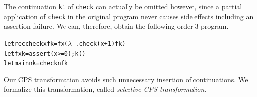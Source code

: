 \begin{enumerate}
 The continuation \texttt{k1} of \texttt{check} can actually be omitted
 however, since a partial application of \texttt{check}
      in the original program never causes side effects including an
      assertion failure.
      We can, therefore, obtain the following order-3 program.
\vspace{-5pt}
\begin{alltt}
 letrec check x f k = f x (\(\lambda\)_.check (x+1) f k)
 let f x k = assert (x >= 0); k ()
 let main n k = check n f k
\end{alltt}
\vspace{-5pt}
      Our CPS transformation avoids such unnecessary insertion of
      continuations.  We formalize this transformation, called
      \emph{selective CPS transformation}.


\end{enumerate}
